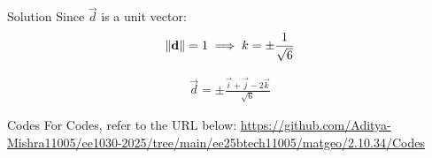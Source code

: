 \documentclass{beamer}
\begin{document}
\begin{frame}{Solution}
Since \(\vec{d}\) is a unit vector:
\begin{align}
\left\lVert\mathbf{d}\right\rVert = 1 
\implies k = \pm \frac{1}{\sqrt{6}}
\end{align}

\begin{align}
\boxed{
\vec{d} = \pm \frac{\vec{i} + \vec{j} - 2\vec{k}}{\sqrt{6}}
}
\end{align}
\end{frame}
\begin{frame}{Codes}
\centering
For Codes, refer to the URL below:  
\url{https://github.com/Aditya-Mishra11005/ee1030-2025/tree/main/ee25btech11005/matgeo/2.10.34/Codes}
\end{frame}
\end{document}
